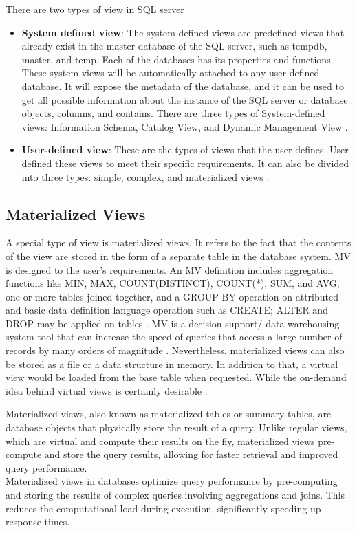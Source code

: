 There are two types of view in SQL server
\begin{itemize}
    \item \textbf{System defined view}: The system-defined views are predefined views that already exist in the master database of the SQL server, such as tempdb, master, and temp. Each of the databases has its properties and functions. These system views will be automatically attached to any user-defined database. It will expose the metadata of the database, and it can be used to get all possible information about the instance of the SQL server or database objects, columns, and contains. There are three types of System-defined views: Information Schema, Catalog View, and Dynamic Management View \cite{chauhan-2024}.
    \item \textbf{User-defined view}: These are the types of views that the user defines. User-defined these views to meet their specific requirements. It can also be divided into three types: simple, complex, and materialized views \cite{javapoint-author-2024}.
\end{itemize}
   
\subsection{Materialized Views}
 A special type of view is materialized views. It refers to the fact that the contents of the view are stored in the form of a separate table in the database system. MV is designed to the user's requirements. An MV definition includes aggregation functions like MIN, MAX, COUNT(DISTINCT), COUNT(*), SUM, and AVG, one or more tables joined together, and a GROUP BY operation on attributed and basic data definition language operation such as CREATE; ALTER and DROP may be applied on tables \cite{Kardel_Thakare}. MV is a decision support/ data warehousing system tool that can increase the speed of queries that access a large number of records by many orders of magnitude \cite{Kishan_Sainath_no_date}. Nevertheless, materialized views can also be stored as a file or a data structure in memory. In addition to that, a virtual view would be loaded from the base table when requested. While the on-demand idea behind virtual views is certainly desirable \cite{jan-no-date,ashadevi-2024}.

\begin{definition}
Materialized views, also known as materialized tables or summary tables, are database objects that physically store the result of a query. Unlike regular views, which are virtual and compute their results on the fly, materialized views pre-compute and store the query results, allowing for faster retrieval and improved query performance.\\
Materialized views in databases optimize query performance by pre-computing and storing the results of complex queries involving aggregations and joins. This reduces the computational load during execution, significantly speeding up response times.

\end{definition}

